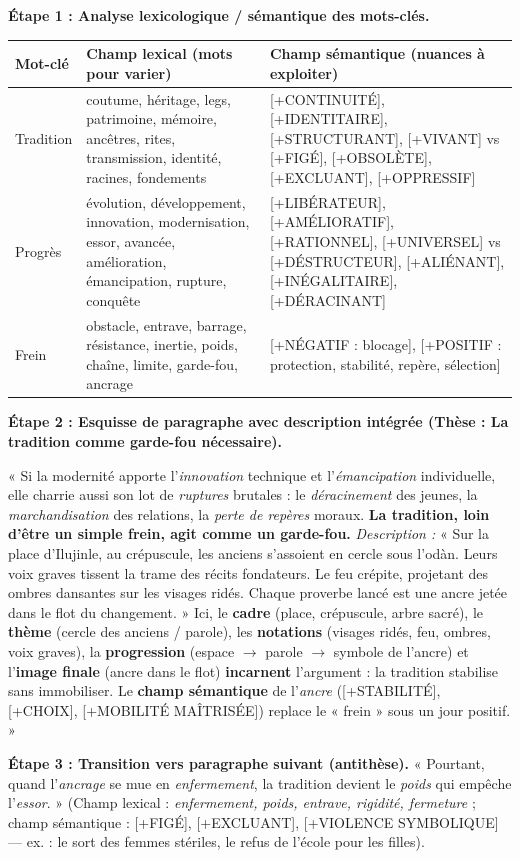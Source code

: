 \documentclass[11pt]{article}
\begin{document}
\begin{exoresolu}
\textbf{Étape 1 : Analyse lexicologique / sémantique des mots-clés.}

\begin{center}
\begin{tabularx}{\linewidth}{|l|X|X|}
\hline
\textbf{Mot-clé} & \textbf{Champ lexical (mots pour varier)} & \textbf{Champ sémantique (nuances à exploiter)} \\
\hline
Tradition & coutume, héritage, legs, patrimoine, mémoire, ancêtres, rites, transmission, identité, racines, fondements & [+CONTINUITÉ], [+IDENTITAIRE], [+STRUCTURANT], [+VIVANT] vs [+FIGÉ], [+OBSOLÈTE], [+EXCLUANT], [+OPPRESSIF] \\
\hline
Progrès & évolution, développement, innovation, modernisation, essor, avancée, amélioration, émancipation, rupture, conquête & [+LIBÉRATEUR], [+AMÉLIORATIF], [+RATIONNEL], [+UNIVERSEL] vs [+DÉSTRUCTEUR], [+ALIÉNANT], [+INÉGALITAIRE], [+DÉRACINANT] \\
\hline
Frein & obstacle, entrave, barrage, résistance, inertie, poids, chaîne, limite, garde-fou, ancrage & [+NÉGATIF : blocage], [+POSITIF : protection, stabilité, repère, sélection] \\
\hline
\end{tabularx}
\end{center}

\textbf{Étape 2 : Esquisse de paragraphe avec description intégrée (Thèse : La tradition comme garde-fou nécessaire).}

« Si la modernité apporte l'\emph{innovation} technique et l'\emph{émancipation} individuelle, elle charrie aussi son lot de \emph{ruptures} brutales : le \emph{déracinement} des jeunes, la \emph{marchandisation} des relations, la \emph{perte de repères} moraux. \textbf{La tradition, loin d'être un simple frein, agit comme un garde-fou.} \emph{Description :} « Sur la place d'Ilujinle, au crépuscule, les anciens s'assoient en cercle sous l'odàn. Leurs voix graves tissent la trame des récits fondateurs. Le feu crépite, projetant des ombres dansantes sur les visages ridés. Chaque proverbe lancé est une ancre jetée dans le flot du changement. » Ici, le \textbf{cadre} (place, crépuscule, arbre sacré), le \textbf{thème} (cercle des anciens / parole), les \textbf{notations} (visages ridés, feu, ombres, voix graves), la \textbf{progression} (espace $\rightarrow$ parole $\rightarrow$ symbole de l'ancre) et l'\textbf{image finale} (ancre dans le flot) \textbf{incarnent} l'argument : la tradition stabilise sans immobiliser. Le \textbf{champ sémantique} de l'\emph{ancre} ([+STABILITÉ], [+CHOIX], [+MOBILITÉ MAÎTRISÉE]) replace le « frein » sous un jour positif. »

\textbf{Étape 3 : Transition vers paragraphe suivant (antithèse).}
« Pourtant, quand l'\emph{ancrage} se mue en \emph{enfermement}, la tradition devient le \emph{poids} qui empêche l'\emph{essor}. » (Champ lexical : \emph{enfermement, poids, entrave, rigidité, fermeture} ; champ sémantique : [+FIGÉ], [+EXCLUANT], [+VIOLENCE SYMBOLIQUE] — ex. : le sort des femmes stériles, le refus de l'école pour les filles).
\end{exoresolu}
\end{document}
